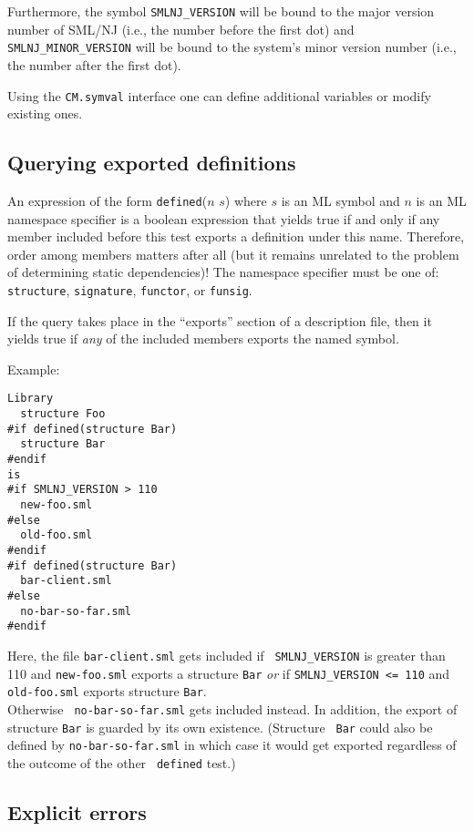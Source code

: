 \documentclass{article}
\begin{document}
Furthermore, the symbol {\tt SMLNJ\_VERSION} will be bound to the
major version number of SML/NJ (i.e., the number before the first dot)
and {\tt SMLNJ\_MINOR\_VERSION} will be bound to the system's minor
version number (i.e., the number after the first dot).

Using the {\tt CM.symval} interface one can define additional
variables or modify existing ones.

\subsection{Querying exported definitions}

An expression of the form {\tt defined}($n$ $s$) where $s$ is an ML
symbol and $n$ is an ML namespace specifier is a boolean expression
that yields true if and only if any member included before this test
exports a definition under this name.  Therefore, order among members
matters after all (but it remains unrelated to the problem of
determining static dependencies)!  The namespace specifier must be one
of: {\tt structure}, {\tt signature}, {\tt functor}, or {\tt funsig}.

If the query takes place in the ``exports'' section of a description
file, then it yields true if {\em any} of the included members exports
the named symbol.

\noindent Example:

\begin{verbatim}
Library
  structure Foo
#if defined(structure Bar)
  structure Bar
#endif
is
#if SMLNJ_VERSION > 110
  new-foo.sml
#else
  old-foo.sml
#endif
#if defined(structure Bar)
  bar-client.sml
#else
  no-bar-so-far.sml
#endif
\end{verbatim}

Here, the file {\tt bar-client.sml} gets included if {\tt
SMLNJ\_VERSION} is greater than 110 and {\tt new-foo.sml} exports a
structure {\tt Bar} {\em or} if {\tt SMLNJ\_VERSION <= 110} and {\tt
old-foo.sml} exports structure {\tt Bar}. \\ Otherwise {\tt
no-bar-so-far.sml} gets included instead.  In addition, the export of
structure {\tt Bar} is guarded by its own existence.  (Structure {\tt
Bar} could also be defined by {\tt no-bar-so-far.sml} in which case it
would get exported regardless of the outcome of the other {\tt
defined} test.)

\subsection{Explicit errors}
\end{document}
